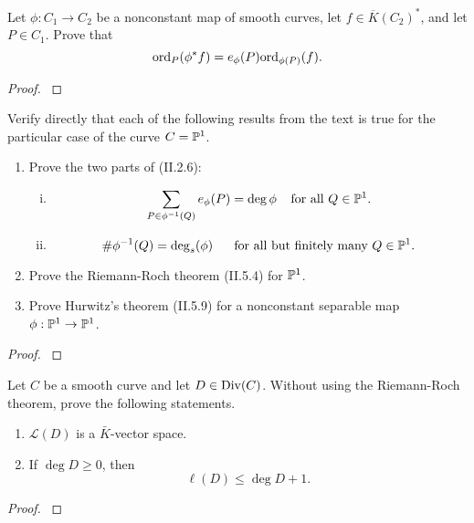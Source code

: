 \documentclass[12pt,reqno]{amsart}
\begin{document}
\begin{exe}\label{2.2}
Let $\phi: C_1 \to C_2$ be a nonconstant map of smooth curves, let $f \in \overline{K}(C_2)^\ast$, and let $P\in C_1$.  Prove that
\[
{\operatorname{ord}}_P(\phi^\ast f)=e_\phi(P){\operatorname{ord}}_{\phi(P)}(f).
\]
\begin{proof}\label{s2.2}

\end{proof} 
\end{exe} 

\begin{exe}\label{2.3}
Verify directly that each of the following results from the text is true for the particular case of the curve $C={\mathbb P}^1$.
\begin{enumerate}
\item
Prove the two parts of (II.2.6):
\begin{enumerate}[(i)]
\item
\[
\sum_{P\in \phi^{-1}(Q)}e_\phi(P)=\deg \phi\;\;\;\;\mbox{for all } Q\in {\mathbb P}^1.
\]
\item
\[
\#\phi^{-1}(Q)=\deg_s(\phi)\;\;\;\;\;\;\mbox{for all but finitely many } Q\in {\mathbb P}^1.
\]
\end{enumerate}
\item
Prove the Riemann-Roch theorem (II.5.4) for ${\mathbb P}^1$.
\item
Prove Hurwitz's theorem (II.5.9) for a nonconstant separable map $\phi: {\mathbb P}^1 \to {\mathbb P}^1$.
\end{enumerate}
\begin{proof}\label{s2.3}

\end{proof} 
\end{exe} 

\begin{exe}\label{2.4}	
Let $C$ be a smooth curve and let $D\in {\operatorname{Div}}(C)$.  Without using the Riemann-Roch theorem, prove the following statements.
\begin{enumerate}
\item
$\mathcal{L}(D)$ is a $\bar{K}$-vector space.

\item
If $\deg D \geq 0$, then
\[
\ell (D)\leq \deg D+1.
\]
\end{enumerate}
\begin{proof}\label{s2.4}

\end{proof} 
\end{exe} 
\end{document}
